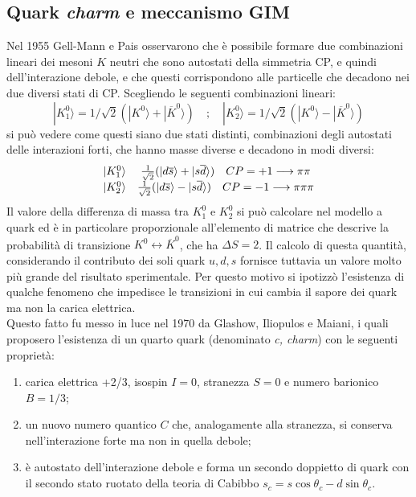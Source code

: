 \documentclass{subnucbo}
\begin{document}
\subsection{Quark \textit{charm} e meccanismo GIM}
\label{subsec:gim}
Nel 1955 Gell-Mann e Pais osservarono che è possibile formare due combinazioni lineari dei mesoni $K$ neutri che sono autostati della simmetria CP, e quindi dell'interazione debole, e che questi corrispondono alle particelle che decadono nei due diversi stati di CP. Scegliendo le seguenti combinazioni lineari:
\begin{equation}
        | K _ { 1 } ^ { 0 } \rangle = 1 / \sqrt { 2 } ( | K ^ { 0 } \rangle + | \overline { K } ^ { 0 } \rangle ) \quad ; \quad | K _ { 2 } ^ { 0 } \rangle = 1 / \sqrt { 2 } ( | K ^ { 0 } \rangle - | \overline { K } ^ { 0 } \rangle )
\end{equation}
si può vedere come questi siano due stati distinti, combinazioni degli autostati delle interazioni forti, che hanno masse diverse e decadono in modi diversi:
\begin{equation}
        \begin{array} { c c } { | K _ { 1 } ^ { 0 } \rangle } & { \frac { 1 } { \sqrt { 2 } } ( | d \overline { s } \rangle + | s \overline { d } \rangle ) \quad C P = + 1 \longrightarrow \pi \pi } \\ { | K _ { 2 } ^ { 0 } \rangle } & { \frac { 1 } { \sqrt { 2 } } ( | d \overline { s } \rangle - | s \overline { d } \rangle ) \quad C P = - 1 \longrightarrow \pi \pi \pi } \end{array}
\end{equation}
Il valore della differenza di massa tra $K^{0}_{1}$ e $K^{0}_{2}$ si può calcolare nel modello a quark ed è in particolare proporzionale all'elemento di matrice che descrive la probabilità di transizione $K ^ { 0 } \leftrightarrow \overline { K } ^ { 0 }$, che ha $\Delta S = 2$. Il calcolo di questa quantità, considerando il contributo dei soli quark $u, d, s$ fornisce tuttavia un valore molto più grande del risultato sperimentale. Per questo motivo si ipotizzò l'esistenza di qualche fenomeno che impedisce le transizioni in cui cambia il sapore dei quark ma non la carica elettrica. \\
Questo fatto fu messo in luce nel 1970 da Glashow, Iliopulos e Maiani, i quali proposero l'esistenza di un quarto quark (denominato \textit{c, charm}) con le seguenti proprietà:
\begin{enumerate}
        \item carica elettrica +2/3, isospin $I=0$, stranezza $S=0$ e numero barionico $B=1/3$;
        \item un nuovo numero quantico $C$ che, analogamente alla stranezza, si conserva nell'interazione forte ma non in quella debole;
        \item è autostato dell'interazione debole e forma un secondo doppietto di quark con il secondo stato ruotato della teoria di Cabibbo $s_{ c } = s \operatorname { c o s } \theta _ { c } - d \operatorname { s i n } \theta _ { c }$.
\end{enumerate}
\end{document}
